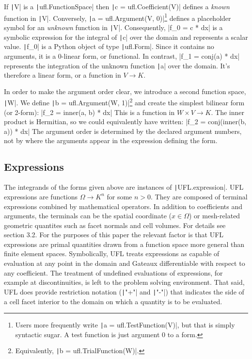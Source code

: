 \documentclass[a4paper,11pt]{article}
\begin{document}
If \texttt|V| is a \texttt|ufl.FunctionSpace| then \texttt|c = ufl.Coefficient(V)| defines a \emph{known} function in \texttt|V|. Conversely, \texttt|a = ufl.Argument(V, 0)|\footnote{Users more frequently write \texttt|a = ufl.TestFunction(V)|, but that is simply syntactic sugar. A test function is just argument 0 to a form.} defines a placeholder symbol for an \emph{unknown} function in \texttt|V|.
Consequently, 
|f_0 = c * dx| 
is a symbolic expression for the integral of \texttt|c| over the domain and represents a scalar value. \texttt|f_0| is a Python object of type \texttt|ufl.Form|. Since it contains no arguments, it is a 0-linear form, or functional. In contrast, 
|f_1 = conj(a) * dx|
represents the integration of the unknown function \texttt|a| over the domain. It's therefore a linear form, or a function in $V\rightarrow K$.

In order to make the argument order clear, we introduce a second function space, \texttt|W|. We  define \texttt|b = ufl.Argument(W, 1)|\footnote{Equivalently, \texttt|b = ufl.TrialFunction(W)|.} and create the simplest bilinear form (or 2-form):
|f_2 = inner(a, b) * dx|
This is a function in $W\times V\rightarrow K$. The inner product is Hermitian, so we could equivalently have written:
|f_2 = conj(inner(b, a)) * dx|
The argument order is determined by the declared argument numbers, not by where the arguments appear in the expression defining the form.

\subsection{Expressions}\label{sec:expressions}

The integrands of the forms given above are instances of \texttt|UFL.expression|. UFL expressions are functions $\Omega\rightarrow K^n$ for some $n>0$. They are composed of terminal expressions combined by mathematical operators. In addition to coefficients and arguments, the terminals can be the spatial coordinate ($x\in\Omega$) or mesh-related geometric quantites such as facet normals and cell volumes. For details see \textcite{alnaes2014} section 3.2. For the purposes of this paper the relevant factor is that UFL expressions are primal quantities drawn from a function space more general than finite element spaces. Symbolically, UFL treats expressions as capable of evaluation at any point in the domain and Gateaux differentiable with respect to any coefficient. The treatment of undefined evaluations of expressions, for example at discontinuities, is left to the problem solving environment. That said, UFL does provide restriction notation (\texttt|"+"| and \texttt|"-"|) that indicates the side of a cell facet interior to the domain on which a quantity is to be evaluated.
\end{document}
